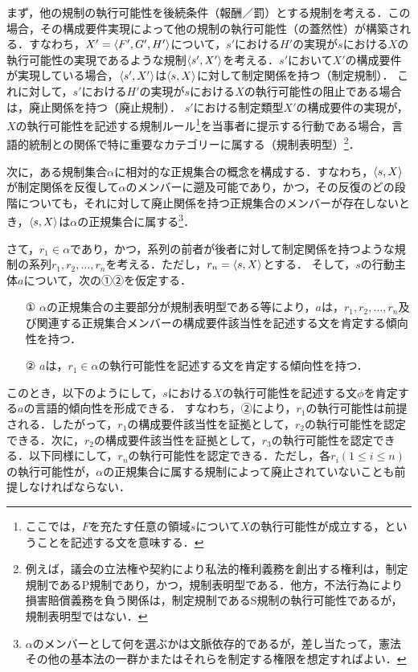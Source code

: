 まず，他の規制の執行可能性を後続条件（報酬／罰）とする規制を考える．この場合，その構成要件実現によって他の規制の執行可能性（の蓋然性）が構築される．すなわち，$X'=\langle F',G',H' \rangle$について，$s'$における$H'$の実現が$s$における$X$の執行可能性の実現であるような規制$ \langle s',X' \rangle $を考える．$s'$において$X'$の構成要件が実現している場合，$ \langle s',X' \rangle $は$ \langle s,X \rangle $に対して制定関係を持つ（制定規制）．
これに対して，$s'$における$H'$の実現が$s$における$X$の執行可能性の阻止である場合は，廃止関係を持つ（廃止規制）．
$s'$における制定類型$X'$の構成要件の実現が，$X$の執行可能性を記述する規制ルール\footnote{ここでは，$F$を充たす任意の領域$s$について$X$の執行可能性が成立する，ということを記述する文を意味する．}を当事者に提示する行動である場合，言語的統制との関係で特に重要なカテゴリーに属する（規制表明型）\footnote{例えば，議会の立法権や契約により私法的権利義務を創出する権利は，制定規制であるP規制であり，かつ，規制表明型である．他方，不法行為により損害賠償義務を負う関係は，制定規制であるS規制の執行可能性であるが，規制表明型ではない．}．

次に，ある規制集合$\alpha$に相対的な正規集合の概念を構成する．すなわち，$\langle s,X \rangle$が制定関係を反復して$\alpha$のメンバーに遡及可能であり，かつ，その反復のどの段階についても，それに対して廃止関係を持つ正規集合のメンバーが存在しないとき，$\langle s,X \rangle$は$\alpha$の正規集合に属する\footnote{$\alpha$のメンバーとして何を選ぶかは文脈依存的であるが，差し当たって，憲法その他の基本法の一群かまたはそれらを制定する権限を想定すればよい．}．

さて，$r_1\in\alpha$であり，かつ，系列の前者が後者に対して制定関係を持つような規制の系列$r_1,r_2,\dots,r_n$を考える．ただし，$r_n =\langle s,X \rangle$とする．
そして，$s$の行動主体$a$について，次の①②を仮定する．
\begin{enumerate}
    \item[①] $\alpha$の正規集合の主要部分が規制表明型である等により，$a$は，$r_1,r_2,\dots,r_n$及び関連する正規集合メンバーの構成要件該当性を記述する文を肯定する傾向性を持つ．
    \item[②] $a$は，$r_1\in\alpha$の執行可能性を記述する文を肯定する傾向性を持つ．
\end{enumerate}
このとき，以下のようにして，$s$における$X$の執行可能性を記述する文$\phi$を肯定する$a$の言語的傾向性を形成できる．
すなわち，②により，$r_1$の執行可能性は前提される．したがって，$r_1$の構成要件該当性を証拠として，$r_2$の執行可能性を認定できる．次に，$r_2$の構成要件該当性を証拠として，$r_3$の執行可能性を認定できる．以下同様にして，$r_n$の執行可能性を認定できる．ただし，各$r_i(1\leq i\leq n)$の執行可能性が，$\alpha$の正規集合に属する規制によって廃止されていないことも前提しなければならない．
